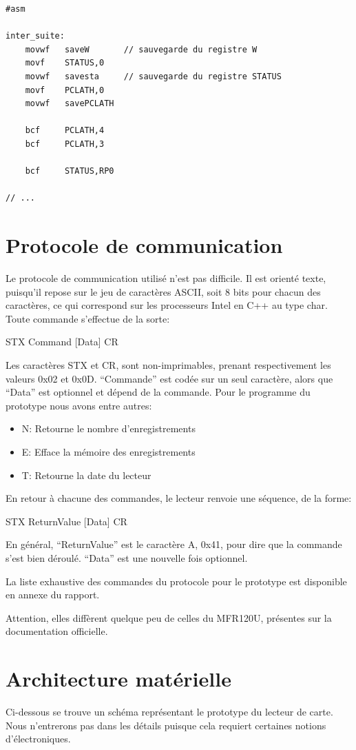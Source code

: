    \lstset{language=[x86masm]Assembler}
    \begin{lstlisting} 
#asm

inter_suite:
	movwf	saveW		// sauvegarde du registre W	
	movf	STATUS,0
	movwf	savesta		// sauvegarde du registre STATUS
	movf    PCLATH,0
	movwf	savePCLATH

	bcf		PCLATH,4
	bcf		PCLATH,3

	bcf	    STATUS,RP0

// ...
    \end{lstlisting}


    \section{Protocole de communication}
Le protocole de communication utilisé n'est pas difficile. Il est orienté 
texte, puisqu'il repose sur le jeu de caractères ASCII, soit 8 bits pour chacun des
caractères, ce qui correspond sur les processeurs Intel en C++ au type char. 
Toute commande s'effectue de la sorte:

STX Command [Data] CR

Les caractères STX et CR, sont non-imprimables, prenant respectivement les
valeurs 0x02 et 0x0D. ``Commande'' est codée sur un seul caractère, alors que ``Data''
est optionnel et dépend de la commande. Pour le programme du prototype nous avons
entre autres:

    \begin{itemize}
    \item N: Retourne le nombre d'enregistrements
    \item E: Efface la mémoire des enregistrements
    \item T: Retourne la date du lecteur
    \end{itemize}

En retour à chacune des commandes, le lecteur renvoie une séquence, de la forme:

STX ReturnValue [Data] CR

En général, ``ReturnValue'' est le caractère A, 0x41, pour dire que
la commande s'est bien déroulé. ``Data'' est une nouvelle fois optionnel.

La liste exhaustive des commandes du protocole pour le prototype est disponible
en annexe du rapport. 

Attention, elles diffèrent quelque peu de celles du MFR120U, présentes sur 
la documentation officielle.


    \section{Architecture matérielle}
Ci-dessous se trouve un schéma représentant le prototype du lecteur de carte.
Nous n'entrerons pas dans les détails puisque cela requiert certaines notions 
d'électroniques.

